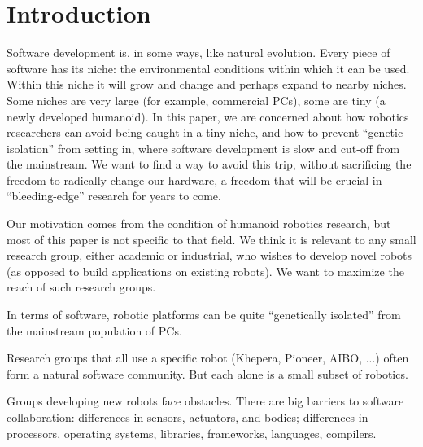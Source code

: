 

\tableofcontents

\section{Introduction}


Software development is, in some ways, like natural 
evolution.  Every piece of software has its niche:
the environmental conditions within which it can be
used.  Within this niche it will grow and change and 
perhaps expand to nearby niches.
Some niches are very large (for example, commercial PCs), some are
tiny (a newly developed humanoid).  In this paper, we are concerned
about how robotics researchers can avoid being caught in a tiny
niche, and how to prevent ``genetic isolation'' from setting in,
where software development is slow and cut-off from the mainstream.
We want to find a way to avoid this trip, without sacrificing
the freedom to radically change our hardware, a freedom that
will be crucial in ``bleeding-edge'' research for years to come.

Our motivation comes from the condition of humanoid robotics 
research, but most of this paper is not specific to that field.
%
We think it is relevant to any small research group, either academic or
industrial, who wishes to develop novel robots (as opposed to 
build applications on existing robots).  We want to maximize the 
reach of such research groups.





In terms of software, robotic platforms can be quite ``genetically
isolated'' from the mainstream population of PCs.  

Research groups that all use a specific robot (Khepera, Pioneer, AIBO,
...) often form a natural software community.  But each alone is 
a small subset of robotics.

Groups developing new robots face obstacles.  There are big barriers
to software collaboration: differences in sensors, actuators, and
bodies; differences in processors, operating systems, libraries,
frameworks, languages, compilers.

